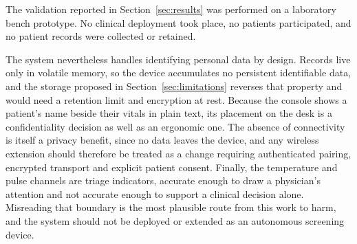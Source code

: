 The validation reported in Section~\ref{sec:results} was performed on a laboratory bench prototype.
No clinical deployment took place, no patients participated, and no patient records were collected
or retained.

The system nevertheless handles identifying personal data by design. Records live only in volatile
memory, so the device accumulates no persistent identifiable data, and the storage proposed in
Section~\ref{sec:limitations} reverses that property and would need a retention limit and
encryption at rest. Because the console shows a patient's name beside their vitals in plain text,
its placement on the desk is a confidentiality decision as well as an ergonomic one. The absence of
connectivity is itself a privacy benefit, since no data leaves the device, and any wireless
extension should therefore be treated as a change requiring authenticated pairing, encrypted
transport and explicit patient consent. Finally, the temperature and pulse channels are triage
indicators, accurate enough to draw a physician's attention and not accurate enough to support a
clinical decision alone. Misreading that boundary is the most plausible route from this work to
harm, and the system should not be deployed or extended as an autonomous screening device.
